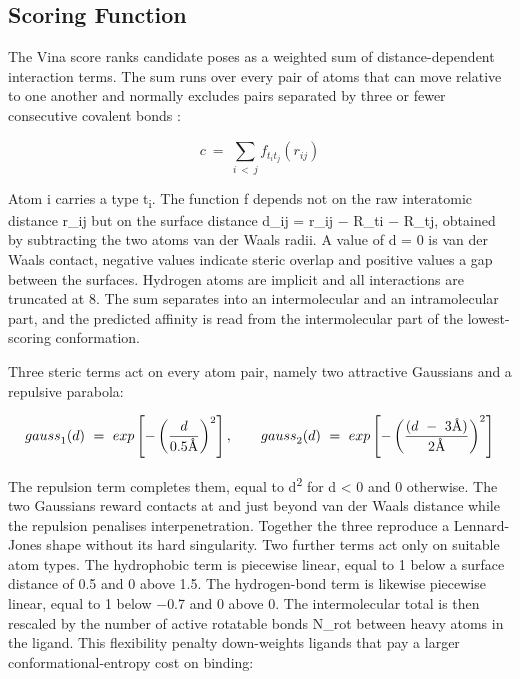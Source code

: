 \hypertarget{vina-scoring-function}{%
\subsection{Scoring Function}\label{vina-scoring-function}}

The Vina score ranks candidate poses as a weighted sum of distance-dependent interaction terms. The sum runs over every pair of atoms that can move relative to one another and normally excludes pairs separated by three or fewer consecutive covalent bonds \cite[p.~2]{ref022}:

\begin{equation}
c\  = \ \sum_{i\  < \ j}^{}{f_{t_{i}t_{j}}\left( r_{ij} \right)}
\label{eq:vina-1}
\end{equation}

Atom i carries a type t\textsubscript{i}. The function f depends not on the raw interatomic distance r\_ij but on the surface distance d\_ij = r\_ij \ensuremath{-} R\_ti \ensuremath{-} R\_tj, obtained by subtracting the two atoms\textquotesingle{} van der Waals radii. A value of d = 0 is van der Waals contact, negative values indicate steric overlap and positive values a gap between the surfaces. Hydrogen atoms are implicit and all interactions are truncated at 8\angstrom{}. The sum separates into an intermolecular and an intramolecular part, and the predicted affinity is read from the intermolecular part of the lowest-scoring conformation.

Three steric terms act on every atom pair, namely two attractive Gaussians and a repulsive parabola:

\begin{equation}
{gauss}_{1}(d)\  = \ exp\left\lbrack - \left( \frac{d}{0.5\angstrom{}} \right)^{2} \right\rbrack,\qquad
{gauss}_{2}(d)\  = \ exp\left\lbrack - \left( \frac{(d\  - \ 3\angstrom{})}{2\angstrom{}} \right)^{2} \right\rbrack
\label{eq:vina-2}
\end{equation}

The repulsion term completes them, equal to d\textsuperscript{2} for d \textless{} 0 and 0 otherwise. The two Gaussians reward contacts at and just beyond van der Waals distance while the repulsion penalises interpenetration. Together the three reproduce a Lennard-Jones shape without its hard singularity. Two further terms act only on suitable atom types. The hydrophobic term is piecewise linear, equal to 1 below a surface distance of 0.5\angstrom{} and 0 above 1.5\angstrom{}. The hydrogen-bond term is likewise piecewise linear, equal to 1 below \ensuremath{-}0.7\angstrom{} and 0 above 0. The intermolecular total is then rescaled by the number of active rotatable bonds N\_rot between heavy atoms in the ligand. This flexibility penalty down-weights ligands that pay a larger conformational-entropy cost on binding:

